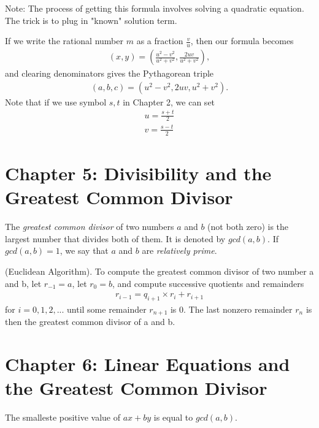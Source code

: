 \documentclass[graybox]{svmult}
\begin{document}
Note: The process of getting this formula involves solving a quadratic equation. The trick is to plug in "known" solution term.

If we write the rational number $m$ as a fraction $\frac{v}{u}$, then our formula becomes
\begin{align*}
(x,y) = \left(\frac{u^2-v^2}{u^2+v^2}, \frac{2uv}{u^2+v^2}\right),
\end{align*}
and clearing denominators gives the Pythagorean triple
\begin{align*}
(a,b,c)=(u^2-v^2,2uv,u^2+v^2).
\end{align*}
Note that if we use symbol $s, t$ in Chapter 2, we can set
\begin{align*}
u = \frac{s+t}{2} \\
v = \frac{s-t}{2}
\end{align*}

\section*{Chapter 5: Divisibility and the Greatest Common Divisor}

\begin{definition}
The \textit{greatest common divisor} of two numbers $a$ and $b$ (not both zero) is the largest number that divides both of them. It is denoted by $gcd(a,b)$. If $gcd(a,b)=1$, we say that $a$ and $b$ are \textit{relatively prime}.
\end{definition}

\begin{svgraybox}
\begin{theorem}
(Euclidean Algorithm). To compute the greatest common divisor of two number a and b, let $r_{-1} = a$, let $r_0 = b$, and compute successive quotients and remainders
\begin{align*}
r_{i-1} = q_{i+1} \times r_i + r_{i+1}
\end{align*}
for $i = 0, 1, 2,...$ until some remainder $r_{n+1}$ is 0. The last nonzero remainder $r_n$ is then the greatest common divisor of a and b.
\end{theorem}
\end{svgraybox}

\section*{Chapter 6: Linear Equations and the Greatest Common Divisor}

The smalleste positive value of $ax + by$ is equal to $gcd(a, b)$.
\end{document}
